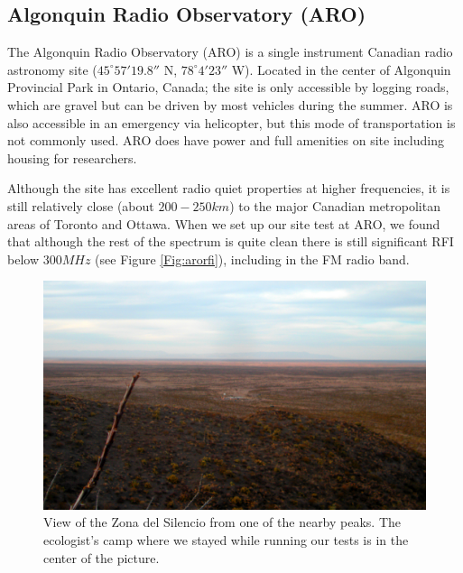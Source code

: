 \subsection{Algonquin Radio Observatory (ARO)}

The Algonquin Radio Observatory (ARO) is a single instrument Canadian radio astronomy site ($45^\circ 57' 19.8''$ N, $78^\circ 4' 23''$ W). Located in the center of Algonquin Provincial Park in Ontario, Canada; the site is only accessible by logging roads, which are gravel but can be driven by most vehicles during the summer. ARO is also accessible in an emergency via helicopter, but this mode of transportation is not commonly used. ARO does have power and full amenities on site including housing for researchers. 

Although the site has excellent radio quiet properties at higher frequencies, it is still relatively close (about $200-250 km$) to the major Canadian metropolitan areas of Toronto and Ottawa. When we set up our site test at ARO, we found that although the rest of the spectrum is quite clean there is still significant RFI below $300 MHz$ (see Figure \ref{Fig:arorfi}), including in the FM radio band. 


\begin{figure}[htb]
\begin{center}
\includegraphics[width=0.9\linewidth]{RFI_testing/figures/zds_overview_shot.jpg}
\caption{View of the Zona del Silencio from one of the nearby peaks. The ecologist's camp where we stayed while running our tests is in the center of the picture.}
\label{Fig:zdsover}
\end{center}
\end{figure}

